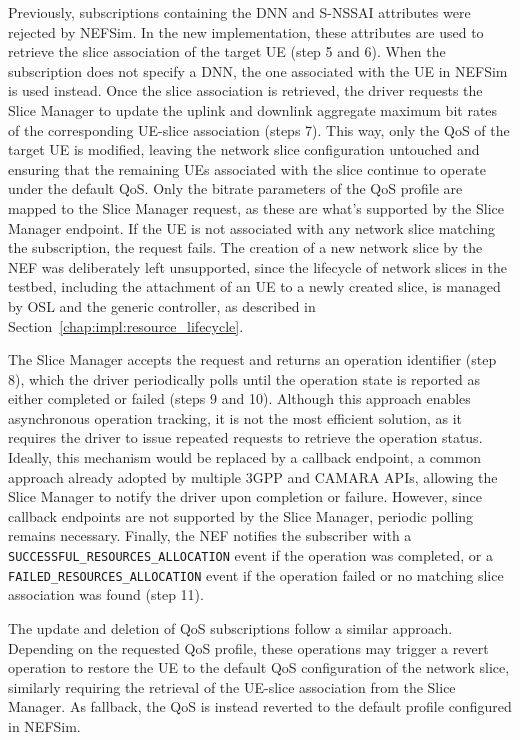 Previously, subscriptions containing the \acs{DNN} and \acs{S-NSSAI} attributes were rejected by \acs{NEF}Sim. In the new implementation, these attributes are used to retrieve the slice association of the target \acs{UE} (step 5 and 6). When the subscription does not specify a \acs{DNN}, the one associated with the \acs{UE} in \acs{NEF}Sim is used instead. Once the slice association is retrieved, the driver requests the Slice Manager to update the uplink and downlink aggregate maximum bit rates of the corresponding \acs{UE}-slice association (steps 7). This way, only the \acs{QoS} of the target \acs{UE} is modified, leaving the network slice configuration untouched and ensuring that the remaining \acsp{UE} associated with the slice continue to operate under the default \acs{QoS}. Only the bitrate parameters of the \acs{QoS} profile are mapped to the Slice Manager request, as these are what's supported by the Slice Manager endpoint. If the \acs{UE} is not associated with any network slice matching the subscription, the request fails. The creation of a new network slice by the \acs{NEF} was deliberately left unsupported, since the lifecycle of network slices in the testbed, including the attachment of an \acs{UE} to a newly created slice, is managed by \acs{OSL} and the generic controller, as described in Section~\ref{chap:impl:resource_lifecycle}.

The Slice Manager accepts the request and returns an operation identifier (step 8), which the driver periodically polls until the operation state is reported as either completed or failed (steps 9 and 10). Although this approach enables asynchronous operation tracking, it is not the most efficient solution, as it requires the driver to issue repeated requests to retrieve the operation status. Ideally, this mechanism would be replaced by a callback endpoint, a common approach already adopted by multiple \acs{3GPP} and CAMARA \acsp{API}, allowing the Slice Manager to notify the driver upon completion or failure. However, since callback endpoints are not supported by the Slice Manager, periodic polling remains necessary. Finally, the \acs{NEF} notifies the subscriber with a \texttt{SUCCESSFUL\_RESOURCES\_ALLOCATION} event if the operation was completed, or a \texttt{FAILED\_RESOURCES\_ALLOCATION} event if the operation failed or no matching slice association was found (step 11).

The update and deletion of \acs{QoS} subscriptions follow a similar approach. Depending on the requested \acs{QoS} profile, these operations may trigger a revert operation to restore the \acs{UE} to the default \acs{QoS} configuration of the network slice, similarly requiring the retrieval of the \acs{UE}-slice association from the Slice Manager. As fallback, the \acs{QoS} is instead reverted to the default profile configured in \acs{NEF}Sim.

